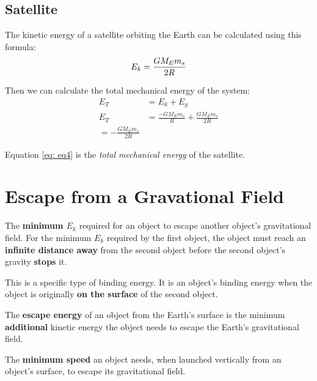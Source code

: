 \subsection{Satellite}
The kinetic energy of a satellite orbiting the Earth can be calculated using this formula:
\begin{equation}
    E_k = \frac{
        G \space M_E \space m_s
    }{
        2R
    }
\end{equation}

Then we can calculate the total mechanical energy of the system:
\begin{align}
    E_T &= E_k + E_g\\
    E_T &= \frac{
        - G M_E m_s
    }{
        R
    } +
    \frac{
        G M_E m_s
    }{
        2R
    } \\
    = -\frac{
        G M_E m_s
    }{
        2R
    } \label{eq: eq4}
\end{align}

Equation \ref{eq: eq4} is the \textit{total mechanical energy} of the satellite.

\newpage
\section{Escape from a Gravational Field}
\begin{definition}
     The \textbf{minimum $E_k$} required for an object to escape another object's gravitational field. For the minimum $E_k$ required by the first object, the object must reach an 
    \textbf{infinite distance away} from the second object before the second object's gravity \textbf{stops} it.
\end{definition}

\begin{definition}
     This is a specific type of binding energy. It is an object's binding energy when the object is originally \textbf{on the surface} of the second object.
\end{definition}

\begin{example}
    The \textbf{escape energy} of an object from the Earth's surface is the minimum \textbf{additional} kinetic energy the object needs to escape the Earth's gravitational field.
\end{example}

\begin{definition}
     The \textbf{minimum speed} an object needs, when launched vertically from an object's surface, to escape its gravitational field. 
\end{definition}

